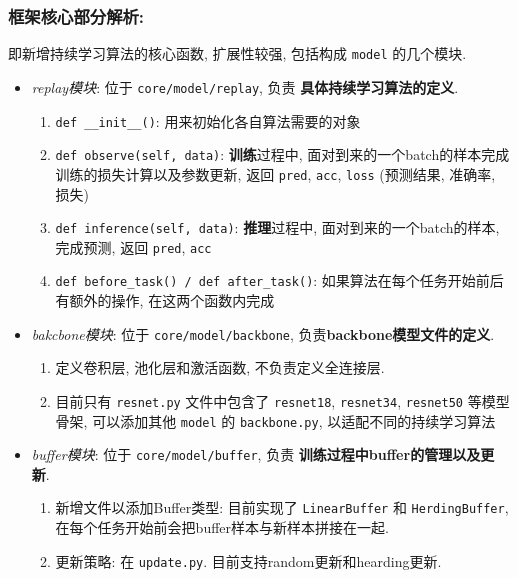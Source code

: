 \subsubsection{框架核心部分解析: }即新增持续学习算法的核心函数, 扩展性较强, 包括构成 \lstinline{model} 的几个模块. 
\begin{itemize}
\item \textit{replay模块}: 位于 \lstinline{core/model/replay}, 负责 \textbf{具体持续学习算法的定义}. 
    \begin{enumerate}
    \item \lstinline{def __init__()}:  用来初始化各自算法需要的对象
    \item \lstinline{def observe(self, data)}:  \textbf{训练}过程中, 面对到来的一个batch的样本完成训练的损失计算以及参数更新, 返回 \lstinline{pred}, \lstinline{acc}, \lstinline{loss} (预测结果, 准确率, 损失)
    \item \lstinline{def inference(self, data)}: \textbf{推理}过程中, 面对到来的一个batch的样本, 完成预测, 返回 \lstinline{pred}, \lstinline{acc}
    \item \lstinline{def before_task() / def after_task()}: 如果算法在每个任务开始前后有额外的操作, 在这两个函数内完成 
    \end{enumerate}
\item \textit{bakcbone模块}: 位于 \lstinline{core/model/backbone}, 负责\textbf{backbone模型文件的定义}. 
    \begin{enumerate}
    \item 定义卷积层, 池化层和激活函数, 不负责定义全连接层. 
    \item 目前只有 \lstinline{resnet.py} 文件中包含了 \lstinline{resnet18}, \lstinline{resnet34}, \lstinline{resnet50} 等模型骨架, 可以添加其他 \lstinline{model} 的 \lstinline{backbone.py}, 以适配不同的持续学习算法
    \end{enumerate}
\item \textit{buffer模块}: 位于 \lstinline{core/model/buffer}, 负责
\textbf{训练过程中buffer的管理以及更新}. 
    \begin{enumerate}
        \item 新增文件以添加Buffer类型: 目前实现了 \lstinline{LinearBuffer} 和 \lstinline{HerdingBuffer}, 在每个任务开始前会把buffer样本与新样本拼接在一起. 
        \item 更新策略: 在 \lstinline{update.py}. 目前支持random更新和hearding更新.  
    \end{enumerate}
\end{itemize}



